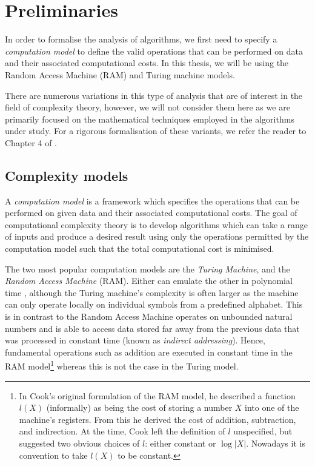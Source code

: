 \chapter{Preliminaries}\label{chp:preliminaries}

In order to formalise the analysis of algorithms, we first need to specify a \emph{computation model} to define the valid operations that can be performed on data and their associated computational costs. In this thesis, we will be using the Random Access Machine (RAM) and Turing machine models.

There are numerous variations in this type of analysis that are of interest in the field of complexity theory, however, we will not consider them here as we are primarily focused on the mathematical techniques employed in the algorithms under study. For a rigorous formalisation of these variants, we refer the reader to Chapter 4 of \cite{burgisser}.

\section{Complexity models}%
\label{sec:Complexity models}

A \textit{computation model} is a framework which specifies the operations that can be performed on given data and their associated computational costs. The goal of computational complexity theory is to develop algorithms which can take a range of inputs and produce a desired result using only the operations permitted by the computation model such that the total computational cost is minimised.

The two most popular computation models are the \textit{Turing Machine}, and the \textit{Random Access Machine} (RAM). Either can emulate the other in polynomial time \cite{ram-model}, although the Turing machine's complexity is often larger as the machine can only operate locally on individual symbols from a predefined alphabet. This is in contrast to the Random Access Machine operates on unbounded natural numbers and is able to access data stored far away from the previous data that was processed in constant time (known as \textit{indirect addressing}). Hence, fundamental operations such as addition are executed in constant time in the RAM model\footnote{In Cook's original formulation of the RAM model, he described a function $l(X)$ (informally) as being the cost of storing a number $X$ into one of the machine's registers. From this he derived the cost of addition, subtraction, and indirection. At the time, Cook left the definition of $l$ unspecified, but suggested two obvious choices of $l$: either constant or $\log |X|$. Nowadays it is convention to take $l(X)$ to be constant.} whereas this is not the case in the Turing model.


